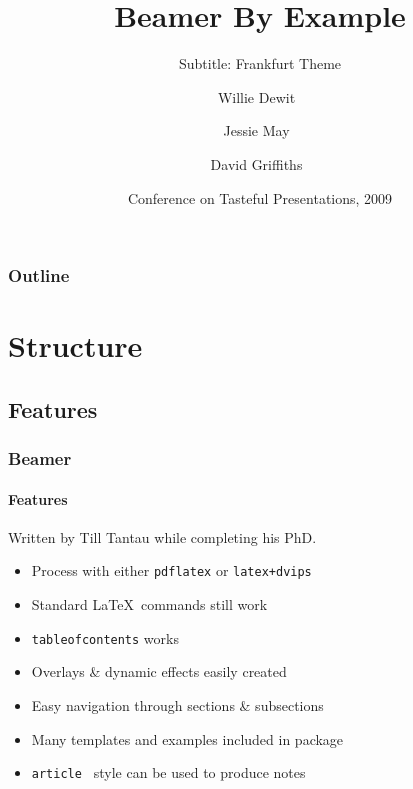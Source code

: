 \documentclass{beamer}
\title[Beamer By Example] %
{Beamer By Example}
\subtitle
{Subtitle: Frankfurt Theme}
\author[dfg] %
{Willie Dewit~\inst{1} \and Jessie May~\inst{2} \and David Griffiths~\inst{3}}
\institute[Universities of Somewhere and Elsewhere] %
{
  \inst{1}%
  Department of Mathematics\\
  University of Somewhere
  \and
  \inst{2}%
  Scottish Institute for Higher \TeX nology
  \and
  \inst{3}%
  University of Dundee}
\date[CTP 2007] %
{Conference on Tasteful Presentations, 2009}
\begin{document}
\begin{frame}
  \titlepage
\end{frame}

\begin{frame}
  \frametitle{Outline}
  \tableofcontents[pausesections]
\end{frame}




\section{Structure}
\subsection{Features}
\begin{frame}
\frametitle{Beamer}
\framesubtitle{Features}
Written by Till Tantau while completing his PhD.
\begin{itemize}
\item Process with either \texttt{pdflatex} or \texttt{latex+dvips}\pause
\item Standard \LaTeX\ commands still work\pause
\item \texttt{tableofcontents} works \pause
\item Overlays \&  dynamic effects easily created\pause
\item Easy navigation through sections \&  subsections\pause
\item Many templates and examples included in package\pause
\item \texttt{article } style can be used to produce notes
\end{itemize}
\end{frame}
\end{document}
